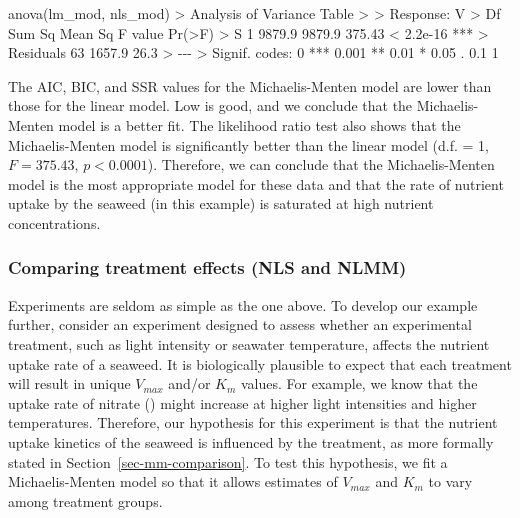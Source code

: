 \documentclass[
  letterpaper,
]{book}
\newenvironment{Shaded}{\begin{snugshade}}{\end{snugshade}}
\newcommand{\DecValTok}[1]{\textcolor[rgb]{0.68,0.00,0.00}{#1}}
\newcommand{\ErrorTok}[1]{\textcolor[rgb]{0.68,0.00,0.00}{#1}}
\newcommand{\FloatTok}[1]{\textcolor[rgb]{0.68,0.00,0.00}{#1}}
\newcommand{\FunctionTok}[1]{\textcolor[rgb]{0.28,0.35,0.67}{#1}}
\newcommand{\NormalTok}[1]{\textcolor[rgb]{0.00,0.23,0.31}{#1}}
\newcommand{\SpecialCharTok}[1]{\textcolor[rgb]{0.37,0.37,0.37}{#1}}
\newcommand{\StringTok}[1]{\textcolor[rgb]{0.13,0.47,0.30}{#1}}
\begin{document}
\begin{Shaded}
\begin{Highlighting}[]
\FunctionTok{anova}\NormalTok{(lm\_mod, nls\_mod)}
\SpecialCharTok{\textgreater{}}\NormalTok{ Analysis of Variance Table}
\SpecialCharTok{\textgreater{}} 
\ErrorTok{\textgreater{}}\NormalTok{ Response}\SpecialCharTok{:}\NormalTok{ V}
\SpecialCharTok{\textgreater{}}\NormalTok{           Df Sum Sq Mean Sq F value    }\FunctionTok{Pr}\NormalTok{(}\SpecialCharTok{\textgreater{}}\NormalTok{F)    }
\SpecialCharTok{\textgreater{}}\NormalTok{ S          }\DecValTok{1} \FloatTok{9879.9}  \FloatTok{9879.9}  \FloatTok{375.43} \SpecialCharTok{\textless{}} \FloatTok{2.2e{-}16} \SpecialCharTok{**}\ErrorTok{*}
\ErrorTok{\textgreater{}}\NormalTok{ Residuals }\DecValTok{63} \FloatTok{1657.9}    \FloatTok{26.3}                      
\SpecialCharTok{\textgreater{}} \SpecialCharTok{{-}{-}{-}}
\ErrorTok{\textgreater{}}\NormalTok{ Signif. codes}\SpecialCharTok{:}  \DecValTok{0} \StringTok{\textquotesingle{}***\textquotesingle{}} \FloatTok{0.001} \StringTok{\textquotesingle{}**\textquotesingle{}} \FloatTok{0.01} \StringTok{\textquotesingle{}*\textquotesingle{}} \FloatTok{0.05} \StringTok{\textquotesingle{}.\textquotesingle{}} \FloatTok{0.1} \StringTok{\textquotesingle{} \textquotesingle{}} \DecValTok{1}
\end{Highlighting}
\end{Shaded}

The AIC, BIC, and SSR values for the Michaelis-Menten model are lower
than those for the linear model. Low is good, and we conclude that the
Michaelis-Menten model is a better fit. The likelihood ratio test also
shows that the Michaelis-Menten model is significantly better than the
linear model (d.f. = 1, \(F=375.43\), \(p<0.0001\)). Therefore, we can
conclude that the Michaelis-Menten model is the most appropriate model
for these data and that the rate of nutrient uptake by the seaweed (in
this example) is saturated at high nutrient concentrations.

\subsubsection{Comparing treatment effects (NLS and
NLMM)}\label{sec-mf-treatments}

Experiments are seldom as simple as the one above. To develop our
example further, consider an experiment designed to assess whether an
experimental treatment, such as light intensity or seawater temperature,
affects the nutrient uptake rate of a seaweed. It is biologically
plausible to expect that each treatment will result in unique
\(V_{max}\) and/or \(K_m\) values. For example, we know that the uptake
rate of nitrate () might increase at higher light intensities
and higher temperatures. Therefore, our hypothesis for this experiment
is that the nutrient uptake kinetics of the seaweed is influenced by the
treatment, as more formally stated in Section~\ref{sec-mm-comparison}.
To test this hypothesis, we fit a Michaelis-Menten model so that it
allows estimates of \(V_{max}\) and \(K_m\) to vary among treatment
groups.
\end{document}
